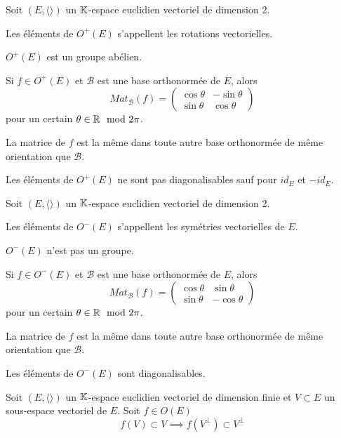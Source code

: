 \documentclass[a4paper, 12pt]{article}
\begin{document}
\begin{proposition}{}{}
    Soit $(E, \langle \rangle)$ un $\mathbb{K}$-espace euclidien vectoriel de dimension 2.

    Les éléments de $O^+(E)$ s'appellent les rotations vectorielles.

    $O^+(E)$ est un groupe abélien.

    Si $f \in O^+(E)$ et $\mathcal{B}$ est une base orthonormée de $E$, alors
    $$
    Mat_{\mathcal{B}}(f) = \begin{pmatrix}
        \cos \theta & -\sin \theta \\
        \sin \theta & \cos \theta
    \end{pmatrix}
    $$
    pour un certain $\theta \in \mathbb{R} \mod 2\pi$.

    La matrice de $f$ est la même dans toute autre base orthonormée de même orientation que $\mathcal{B}$.

    Les éléments de $O^+(E)$ ne sont pas diagonalisables sauf pour $id_E$ et $-id_E$.
\end{proposition}

\begin{proposition}{}{}
    Soit $(E, \langle \rangle)$ un $\mathbb{K}$-espace euclidien vectoriel de dimension 2.

    Les éléments de $O^-(E)$ s'appellent les symétries vectorielles de $E$.

    $O^-(E)$ n'est pas un groupe.

    Si $f \in O^-(E)$ et $\mathcal{B}$ est une base orthonormée de $E$, alors
    $$
    Mat_{\mathcal{B}}(f) = \begin{pmatrix}
        \cos \theta & \sin \theta \\
        \sin \theta & -\cos \theta
    \end{pmatrix}
    $$
    pour un certain $\theta \in \mathbb{R} \mod 2\pi$.

    La matrice de $f$ est la même dans toute autre base orthonormée de même orientation que $\mathcal{B}$.

    Les éléments de $O^-(E)$ sont diagonalisables.
\end{proposition}

\begin{lemme}{}{}
    Soit $(E, \langle \rangle)$ un $\mathbb{K}$-espace euclidien vectoriel de dimension finie et $V \subset E$ un sous-espace vectoriel de $E$.
    Soit $f \in O(E)$
    $$
    f(V) \subset V \implies f(V^\perp) \subset V^\perp
    $$
\end{lemme}
\end{document}
